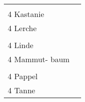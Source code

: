 \documentclass{article}\usepackage[ngerman]{babel}\usepackage{geometry}\usepackage{lmodern}
\begin{document}
\begin{table}[p]
  \begin{tabular}{ll}    \hspace{-2em}    \fbox{\begin{minipage}[t][6cm][t]{8cm}
        \fontsize{45}{54} \selectfont
        \phantom{ }\\
      \phantom{ }4 Kastanie    \end{minipage}}
    &
\fbox{\begin{minipage}[t][6cm][t]{8cm}
        \fontsize{45}{54} \selectfont
        \phantom{ }\\
        \phantom{ } 4 Lerche      \end{minipage}}\\    \hspace{-2em}    \fbox{\begin{minipage}[t][6cm][t]{8cm}
        \fontsize{45}{54} \selectfont
        \phantom{ }\\
      \phantom{ }4 Linde    \end{minipage}}
    &
\fbox{\begin{minipage}[t][6cm][t]{8cm}
        \fontsize{45}{54} \selectfont
        \phantom{ }\\
        \phantom{ } 4 Mammut- baum      \end{minipage}}\\    \hspace{-2em}    \fbox{\begin{minipage}[t][6cm][t]{8cm}
        \fontsize{45}{54} \selectfont
        \phantom{ }\\
      \phantom{ }4 Pappel    \end{minipage}}
    &
\fbox{\begin{minipage}[t][6cm][t]{8cm}
        \fontsize{45}{54} \selectfont
        \phantom{ }\\
        \phantom{ } 4 Tanne      \end{minipage}}\\\end{tabular}
\end{table}
\end{document}
